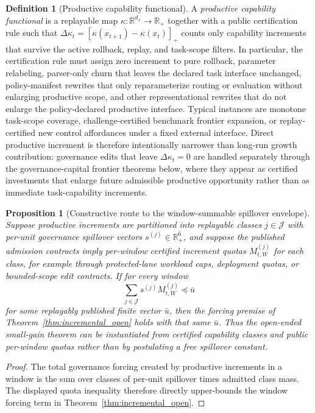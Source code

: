 \documentclass[11pt]{article}
\newtheorem{proposition}[theorem]{Proposition}
\theoremstyle{definition}
\newtheorem{definition}[theorem]{Definition}
\newcommand{\R}{\mathbb{R}}
\newcommand{\1}{\mathbf{1}}
\begin{document}
\begin{definition}[Productive capability functional]\label{def:productive_capability}
A \emph{productive capability functional} is a replayable map $\kappa:\R^{d_x}\to\R_+$ together with a public certification rule such that $\Delta\kappa_t=[\kappa(x_{t+1})-\kappa(x_t)]_+$ counts only capability increments that survive the active rollback, replay, and task-scope filters. In particular, the certification rule must assign zero increment to pure rollback, parameter relabeling, parser-only churn that leaves the declared task interface unchanged, policy-manifest rewrites that only reparameterize routing or evaluation without enlarging productive scope, and other representational rewrites that do not enlarge the policy-declared productive interface. Typical instances are monotone task-scope coverage, challenge-certified benchmark frontier expansion, or replay-certified new control affordances under a fixed external interface. Direct productive increment is therefore intentionally narrower than long-run growth contribution: governance edits that leave $\Delta\kappa_t=0$ are handled separately through the governance-capital frontier theorems below, where they appear as certified investments that enlarge future admissible productive opportunity rather than as immediate task-capability increments.
\end{definition}

\begin{proposition}[Constructive route to the window-summable spillover envelope]\label{prop:constructive_spillover}
Suppose productive increments are partitioned into replayable classes $j\in\mathcal J$ with per-unit governance spillover vectors $s^{(j)}\in\R_+^6$, and suppose the published admission contracts imply per-window certified increment quotas $M_{t,W}^{(j)}$ for each class, for example through protected-lane workload caps, deployment quotas, or bounded-scope edit contracts. If for every window
\[
\sum_{j\in\mathcal J} s^{(j)} M_{t,W}^{(j)} \preceq \bar u
\]
for some replayably published finite vector $\bar u$, then the forcing premise of Theorem~\ref{thm:incremental_open} holds with that same $\bar u$. Thus the open-ended small-gain theorem can be instantiated from certified capability classes and public per-window quotas rather than by postulating a free spillover constant.
\end{proposition}

\begin{proof}
The total governance forcing created by productive increments in a window is the sum over classes of per-unit spillover times admitted class mass. The displayed quota inequality therefore directly upper-bounds the window forcing term in Theorem~\ref{thm:incremental_open}.
\end{proof}
\end{document}
